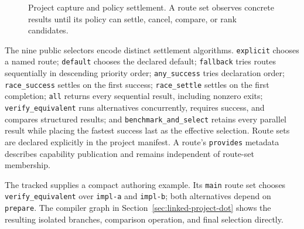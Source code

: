 \documentclass[11pt,oneside]{article}
\begin{document}
\begin{figure}[htbp]
\centering
{}
\caption{Project capture and policy settlement. A route set observes concrete
results until its policy can settle, cancel, compare, or rank candidates.}
\label{fig:project-route-loop}
\end{figure}

The nine public selectors encode distinct settlement algorithms.
\texttt{explicit} chooses a named route; \texttt{default} chooses the declared
default; \texttt{fallback} tries routes sequentially in descending priority
order; \texttt{any\_success} tries declaration order; \texttt{race\_success}
settles on the first success; \texttt{race\_settle} settles on the first
completion; \texttt{all} returns every sequential result, including nonzero
exits; \texttt{verify\_equivalent} runs alternatives concurrently, requires
success, and compares structured results; and
\texttt{benchmark\_and\_select} retains every parallel result while placing
the fastest success last as the effective selection. Route sets are declared
explicitly in the project manifest. A route's \texttt{provides} metadata
describes capability publication and remains independent of route-set
membership.

The tracked  supplies a
compact authoring example. Its \texttt{main} route set chooses
\texttt{verify\_equivalent} over \texttt{impl-a} and \texttt{impl-b}; both
alternatives depend on \texttt{prepare}. The compiler graph in
Section~\ref{sec:linked-project-dot} shows the resulting isolated branches,
comparison operation, and final selection directly.
\end{document}
